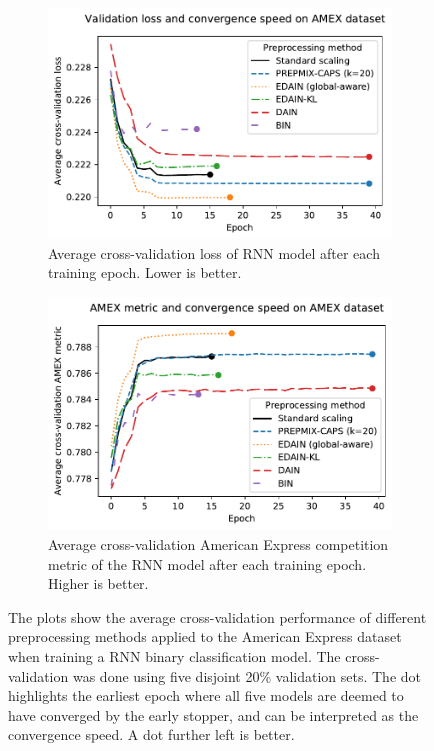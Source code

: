 \documentclass{statsmsc}
\begin{document}
{%
\begin{figure}[htp]
    \centering
    \begin{subfigure}[b]{0.99\textwidth}
        \centering
        \includegraphics[scale=.9]{figures/amex_performance_convergence.pdf}
        \caption{Average cross-validation loss of \ac{RNN} model after each training epoch.
        Lower is better.}
        \label{fig:amex_performance_loss}
    \end{subfigure}
    \hfill
    \begin{subfigure}[b]{0.99\textwidth}
        \centering
        \includegraphics[scale=.9]{figures/amex_performance_convergence_metric.pdf}
        \caption{Average cross-validation American Express competition metric of the \ac{RNN} model
        after each training epoch. Higher is better.}
        \label{fig:amex_performance_metric}
    \end{subfigure}
    \caption{
        The plots show the average cross-validation performance of different preprocessing methods
        applied to the American Express dataset when training a \ac{RNN} binary classification model.
        The cross-validation was done using five disjoint 20\% validation sets.
        The dot highlights the earliest epoch where all five models are deemed to have converged by
        the early stopper, and can be interpreted as the convergence speed. A dot further left is
        better.
    }%
    \label{fig:amex_performance}
\end{figure}

}
\end{document}
